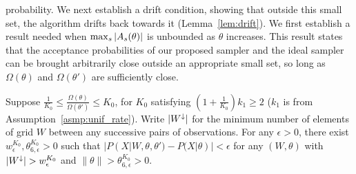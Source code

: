 probability. We next establish a drift condition, showing that outside 
this small set, the algorithm drifts back towards it 
(Lemma~\ref{lem:drift}).
We first establish a result needed when ${\max_s |A_s(\theta)|}$ is unbounded 
as $\theta$ increases.
This result states that the acceptance probabilities of our proposed
sampler and the ideal sampler can be brought arbitrarily close
outside an appropriate small set, so long as $\Omega(\theta)$ and
$\Omega(\theta')$ are sufficiently close.
  \begin{lemma}
  Suppose %
  $\frac{1}{K_0} \le \frac{\Omega(\theta)}{\Omega(\theta')} \leq K_0
  $, for $K_0$ satisfying $(1 + \frac{1}{K_0})k_1 \ge 2$  
  ($k_1$ is from Assumption~\ref{asmp:unif_rate}). Write ${|W^\downarrow}|$ for the
  minimum number of elements of grid $W$ between any successive pairs of observations.
  For any $\epsilon > 0$, there exist  $w^{K_0}_\epsilon,  \theta_{6, \epsilon}^{K_0} > 0$ such that
  $|P(X| W, \theta, \theta') - P(X | \theta)| < \epsilon$
  for any $(W, \theta)$ with ${|W^\downarrow}| > w^{K_0}_\epsilon$ and $\| \theta \| > \theta_{6, \epsilon}^{K_0} > 0$.
  \label{lem:eigenvalue_lemma}
  \end{lemma}
